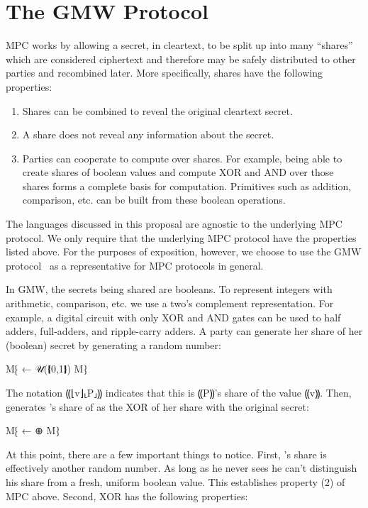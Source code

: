 \chapter{The GMW Protocol}
\label{ch:gmw}

MPC works by allowing a secret, in cleartext, to be split up into many ``shares'' which are considered ciphertext
and therefore may be safely distributed to other parties and recombined later. More specifically, shares have the following properties:
\begin{enumerate}
\item Shares can be combined to reveal the original cleartext secret.
\item A share does not reveal any information about the secret.
\item Parties can cooperate to compute over shares. For example, being able to create shares of boolean values
  and compute XOR and AND over those shares forms a complete basis for computation. Primitives such as addition,
  comparison, etc. can be built from these boolean operations.
\end{enumerate}

The languages discussed in this proposal are agnostic to the underlying MPC protocol. We only require that the underlying MPC protocol
have the properties listed above. For the purposes of exposition, however, we choose to use the GMW protocol~\cite{10.1145/28395.28420} as a
representative for MPC protocols in general.

In GMW, the secrets being shared are booleans. To represent integers with arithmetic, comparison, etc. we use a two's
complement representation. For example, a digital circuit with only XOR and AND gates can be used to half adders,
full-adders, and ripple-carry adders. A party \alice can generate her share of her (boolean) secret \aliceSec by
generating a random number:

M⁅
\aliceSh{\aliceSec} ← 𝒰(❴0,1❵)
M⁆

The notation ⸨⌊v⌋⸤P⸥⸩ indicates that this is ⸨P⸩'s share of the value ⸨v⸩. Then, \alice generates \bob's share of \aliceSec
as the XOR of her share with the original secret:

M⁅
\bobSh{\aliceSec} ← \aliceSh{\aliceSec} ⊕ \aliceSec
M⁆

At this point, there are a few important things to notice. First, \bob's share is effectively another random number.
As long as he never sees \aliceSh{\aliceSec} he can't distinguish his share \bobSh{\aliceSec} from a fresh, uniform
boolean value. This establishes property (2) of MPC above. Second, XOR has the following properties:

